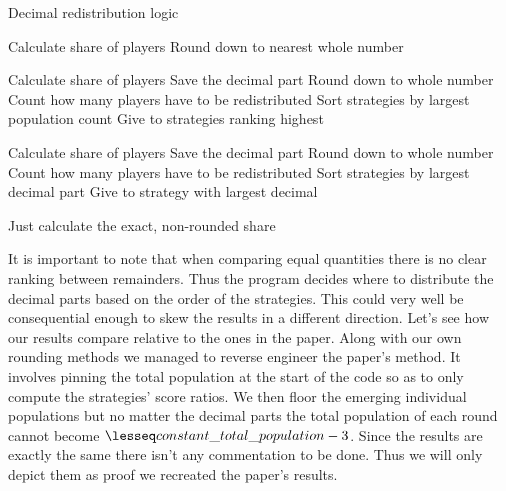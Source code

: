 \documentclass[12pt]{report}
\begin{document}
\begin{algorithm}
\caption{Decimal redistribution logic}
\begin{algorithmic}[1]
      \State Calculate share of players
      \State Round down to nearest whole number
  \EndFor
\EndIf

      \State Calculate share of players
      \State Save the decimal part
      \State Round down to whole number
  \EndFor
  \State Count how many players have to be redistributed
  \State Sort strategies by largest population count
    \State Give to strategies ranking highest
  \EndFor
\EndIf

      \State Calculate share of players
      \State Save the decimal part
      \State Round down to whole number
  \EndFor
  \State Count how many players have to be redistributed 
  \State Sort strategies by largest decimal part
    \State Give to strategy with largest decimal
  \EndFor
\EndIf

      \State Just calculate  the exact, non-rounded share
  \EndFor
\EndIf    
\end{algorithmic}
\end{algorithm}


It is important to note that when comparing equal quantities there is no clear ranking between remainders. Thus the program decides where to distribute the decimal parts based on the order of the strategies. This could very well be consequential enough to skew the results in a different direction. Let's see how our results compare relative to the ones in the paper. Along with our own rounding methods we managed to reverse engineer the paper's method. It involves pinning the total population at the start of the code so as to only compute the strategies' score ratios. We then floor the emerging individual populations but no matter the decimal parts the total population of each round cannot become 
$\lesseq constant\_total\_population-3$. Since the results are exactly the same there isn't any commentation to be done. Thus we will only depict them as proof we recreated the paper's results.
\newpage

\end{document}
